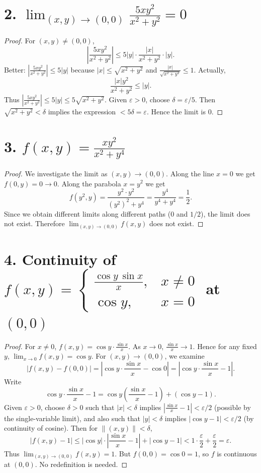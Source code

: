 \documentclass{article}
\begin{document}
\section*{2. $\displaystyle \lim_{(x,y)\to(0,0)}\frac{5xy^2}{x^2+y^2}=0$}
\begin{proof}
	For $(x,y)\neq(0,0)$,
	\[
		\left|\frac{5xy^2}{x^2+y^2}\right| \le 5|y|\cdot\frac{|x|}{x^2+y^2}\cdot|y|.
	\]
	Better: $\left|\frac{5xy^2}{x^2+y^2}\right| \le 5|y|$ because $|x|\le \sqrt{x^2+y^2}$ and $\frac{|x|}{\sqrt{x^2+y^2}}\le1$. Actually,
	\[
		\frac{|x|y^2}{x^2+y^2} \le |y|.
	\]
	Thus $\left|\frac{5xy^2}{x^2+y^2}\right| \le 5|y| \le 5\sqrt{x^2+y^2}$.
	Given $\varepsilon>0$, choose $\delta=\varepsilon/5$. Then $\sqrt{x^2+y^2}<\delta$ implies the expression $<5\delta=\varepsilon$. Hence the limit is $0$.
\end{proof}

\section*{3. $\displaystyle f(x,y)=\frac{xy^2}{x^2+y^4}$}
\begin{proof}
	We investigate the limit as $(x,y)\to(0,0)$. Along the line $x=0$ we get $f(0,y)=0\to0$. Along the parabola $x=y^2$ we get
	\[
		f(y^2,y)=\frac{y^2\cdot y^2}{(y^2)^2+y^4}=\frac{y^4}{y^4+y^4}=\frac12.
	\]
	Since we obtain different limits along different paths ($0$ and $1/2$), the limit does not exist. Therefore $\displaystyle\lim_{(x,y)\to(0,0)}f(x,y)$ does not exist.
\end{proof}

\section*{4. Continuity of $f(x,y)=\begin{cases} \frac{\cos y\,\sin x}{x}, & x\neq0 \\ \cos y, & x=0 \end{cases}$ at $(0,0)$}
\begin{proof}
	For $x\neq0$, $f(x,y)=\cos y\cdot\frac{\sin x}{x}$. As $x\to0$, $\frac{\sin x}{x}\to1$. Hence for any fixed $y$, $\lim_{x\to0}f(x,y)=\cos y$. For $(x,y)\to(0,0)$, we examine
	\[
		|f(x,y)-f(0,0)| = \left|\cos y\cdot\frac{\sin x}{x}-\cos0\right| = \left|\cos y\cdot\frac{\sin x}{x}-1\right|.
	\]
	Write
	\[
		\cos y\cdot\frac{\sin x}{x}-1 = \cos y\left(\frac{\sin x}{x}-1\right) + (\cos y-1).
	\]
	Given $\varepsilon>0$, choose $\delta>0$ such that $|x|<\delta$ implies $|\frac{\sin x}{x}-1|<\varepsilon/2$ (possible by the single-variable limit), and also such that $|y|<\delta$ implies $|\cos y-1|<\varepsilon/2$ (by continuity of cosine). Then for $\|(x,y)\|<\delta$,
	\[
		|f(x,y)-1|\le |\cos y|\cdot\left|\frac{\sin x}{x}-1\right| + |\cos y-1| < 1\cdot\frac{\varepsilon}{2}+\frac{\varepsilon}{2}=\varepsilon.
	\]
	Thus $\lim_{(x,y)\to(0,0)}f(x,y)=1$. But $f(0,0)=\cos0=1$, so $f$ is continuous at $(0,0)$. No redefinition is needed.
\end{proof}
\end{document}

